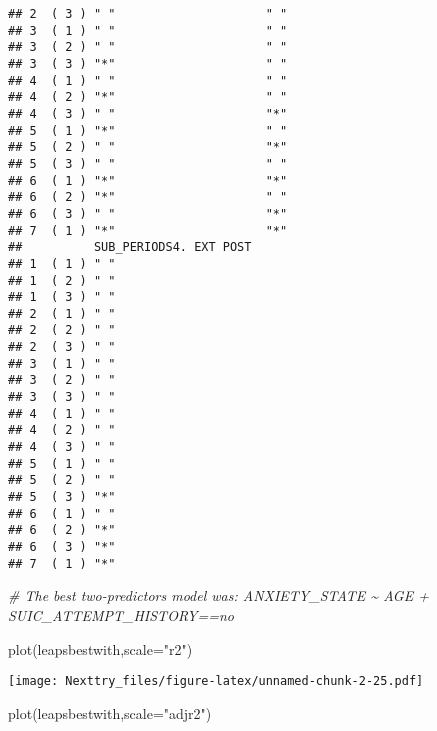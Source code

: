 \documentclass[
]{book}
\newenvironment{Shaded}{\begin{snugshade}}{\end{snugshade}}
\newcommand{\AttributeTok}[1]{\textcolor[rgb]{0.77,0.63,0.00}{#1}}
\newcommand{\CommentTok}[1]{\textcolor[rgb]{0.56,0.35,0.01}{\textit{#1}}}
\newcommand{\FunctionTok}[1]{\textcolor[rgb]{0.00,0.00,0.00}{#1}}
\newcommand{\NormalTok}[1]{#1}
\newcommand{\StringTok}[1]{\textcolor[rgb]{0.31,0.60,0.02}{#1}}
\begin{document}
\begin{verbatim}
## 2  ( 3 ) " "                     " "                      
## 3  ( 1 ) " "                     " "                      
## 3  ( 2 ) " "                     " "                      
## 3  ( 3 ) "*"                     " "                      
## 4  ( 1 ) " "                     " "                      
## 4  ( 2 ) "*"                     " "                      
## 4  ( 3 ) " "                     "*"                      
## 5  ( 1 ) "*"                     " "                      
## 5  ( 2 ) " "                     "*"                      
## 5  ( 3 ) " "                     " "                      
## 6  ( 1 ) "*"                     "*"                      
## 6  ( 2 ) "*"                     " "                      
## 6  ( 3 ) " "                     "*"                      
## 7  ( 1 ) "*"                     "*"                      
##          SUB_PERIODS4. EXT POST
## 1  ( 1 ) " "                   
## 1  ( 2 ) " "                   
## 1  ( 3 ) " "                   
## 2  ( 1 ) " "                   
## 2  ( 2 ) " "                   
## 2  ( 3 ) " "                   
## 3  ( 1 ) " "                   
## 3  ( 2 ) " "                   
## 3  ( 3 ) " "                   
## 4  ( 1 ) " "                   
## 4  ( 2 ) " "                   
## 4  ( 3 ) " "                   
## 5  ( 1 ) " "                   
## 5  ( 2 ) " "                   
## 5  ( 3 ) "*"                   
## 6  ( 1 ) " "                   
## 6  ( 2 ) "*"                   
## 6  ( 3 ) "*"                   
## 7  ( 1 ) "*"
\end{verbatim}

\begin{Shaded}
\begin{Highlighting}[]
\CommentTok{\# The best two{-}predictors model was: ANXIETY\_STATE \textasciitilde{} AGE + SUIC\_ATTEMPT\_HISTORY==no}

\FunctionTok{plot}\NormalTok{(leapsbestwith,}\AttributeTok{scale=}\StringTok{"r2"}\NormalTok{)}
\end{Highlighting}
\end{Shaded}

\texttt{[image: Nexttry\_files/figure-latex/unnamed-chunk-2-25.pdf]}

\begin{Shaded}
\begin{Highlighting}[]
\FunctionTok{plot}\NormalTok{(leapsbestwith,}\AttributeTok{scale=}\StringTok{"adjr2"}\NormalTok{)}
\end{Highlighting}
\end{Shaded}
\end{document}
